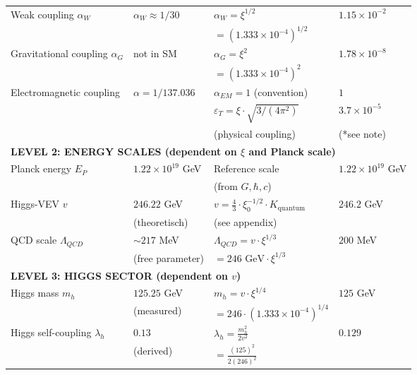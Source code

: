 \documentclass[12pt,a4paper]{article}
\begin{document}
\begin{longtable}{p{5cm}p{4cm}p{3.5cm}p{3.5cm}}
	Weak coupling $\alpha_W$ & $\alpha_W \approx 1/30$ & $\alpha_W = \xi^{1/2}$ & $1.15 \times 10^{-2}$ \\
	& & $= (1.333 \times 10^{-4})^{1/2}$ & \\[0.3em]
	
	Gravitational coupling $\alpha_G$ & not in SM & $\alpha_G = \xi^{2}$ & $1.78 \times 10^{-8}$ \\
	& & $= (1.333 \times 10^{-4})^{2}$ & \\[0.3em]
	
	Electromagnetic coupling & $\alpha = 1/137.036$ & $\alpha_{EM} = 1$ (convention) & $1$ \\
	& & $\varepsilon_T = \xi \cdot \sqrt{3/(4\pi^2)}$ & $3.7 \times 10^{-5}$ \\
	& & (physical coupling) & (*see note) \\[0.3em]
	
	\midrule
	\multicolumn{4}{l}{\textbf{LEVEL 2: ENERGY SCALES (dependent on $\xi$ and Planck scale)}} \\
	\midrule
	
	Planck energy $E_P$ & $1.22 \times 10^{19}$ GeV & Reference scale & $1.22 \times 10^{19}$ GeV \\
	& & (from $G, \hbar, c$) & \\[0.3em]
	
Higgs-VEV $v$ & $246.22$ GeV & $v = \frac{4}{3} \cdot \xi_0^{-1/2} \cdot K_{\text{quantum}}$ & $246.2$ GeV \\
& (theoretisch) & (see appendix) & \\[0.3em]
	
	QCD scale $\Lambda_{QCD}$ & $\sim 217$ MeV & $\Lambda_{QCD} = v \cdot \xi^{1/3}$ & $200$ MeV \\
	& (free parameter) & $= 246 \text{ GeV} \cdot \xi^{1/3}$ & \\[0.3em]
	
	\midrule
	\multicolumn{4}{l}{\textbf{LEVEL 3: HIGGS SECTOR (dependent on $v$)}} \\
	\midrule
	
	Higgs mass $m_h$ & $125.25$ GeV & $m_h = v \cdot \xi^{1/4}$ & $125$ GeV \\
	& (measured) & $= 246 \cdot (1.333 \times 10^{-4})^{1/4}$ & \\[0.3em]
	
	Higgs self-coupling $\lambda_h$ & $0.13$ & $\lambda_h = \frac{m_h^2}{2v^2}$ & $0.129$ \\
	& (derived) & $= \frac{(125)^2}{2(246)^2}$ & \\[0.3em]
	

\end{longtable}
\end{document}
